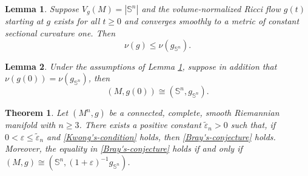 \documentclass[10pt,a4paper]{amsart}
\newtheorem{theorem}{Theorem}
\newtheorem{lemma}{Lemma}
\newcommand{\Sph}{\mathbb S}
\newcommand{\eps}{\varepsilon}
\begin{document}
\begin{lemma}\label{lem:round-flow-upper}
Suppose $V_g(M)=|\Sph^n|$ and the volume-normalized Ricci flow $g(t)$ starting at
$g$ exists for all $t\geq0$ and converges smoothly  to a metric of constant sectional curvature one. Then
\begin{equation}\label{eq:nu-upper}
\nu(g)\leq\nu(g_{\Sph^n}).
\end{equation}
\end{lemma}

\begin{lemma}\label{lemma:equalrigid}
    Under the assumptions of Lemma \ref{lem:round-flow-upper}, suppose in addition that $\nu(g(0))=\nu(g_{\Sph^n})$, then $$(M, g(0))\cong(\Sph^n, g_{\Sph^n}).$$
\end{lemma}

\begin{theorem}
        Let $(M^n,g)$ be a connected, complete,  smooth Riemannian manifold with $n\geq 3$. There exists a positive constant $\tilde\varepsilon_n>0$ such that, if $0<\varepsilon\leq \tilde\varepsilon_n$ and \eqref{Kwong's-condition} holds,   then \eqref{Bray's-conjecture} holds. {Moreover, the equality in \eqref{Bray's-conjecture} holds if and only if $(M, g)\cong(\Sph^n, (1+\eps)^{-1}g_{\Sph^n})$.}
\end{theorem}
\end{document}

